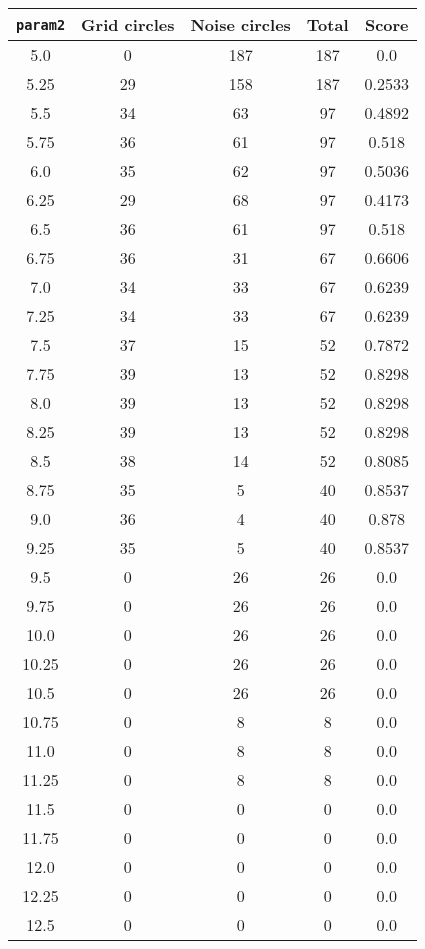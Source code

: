 \documentclass[letterpaper, 12pt]{article}
\begin{document}
\begin{longtable}{|c|c|c|c|c|}
\hline
\textbf{\texttt{param2}} & \textbf{Grid circles} & \textbf{Noise circles} & \textbf{Total} & \textbf{Score} \\
\hline
5.0 & 0 & 187 & 187 & 0.0 \\
\hline
5.25 & 29 & 158 & 187 & 0.2533 \\
\hline
5.5 & 34 & 63 & 97 & 0.4892 \\
\hline
5.75 & 36 & 61 & 97 & 0.518 \\
\hline
6.0 & 35 & 62 & 97 & 0.5036 \\
\hline
6.25 & 29 & 68 & 97 & 0.4173 \\
\hline
6.5 & 36 & 61 & 97 & 0.518 \\
\hline
6.75 & 36 & 31 & 67 & 0.6606 \\
\hline
7.0 & 34 & 33 & 67 & 0.6239 \\
\hline
7.25 & 34 & 33 & 67 & 0.6239 \\
\hline
7.5 & 37 & 15 & 52 & 0.7872 \\
\hline
7.75 & 39 & 13 & 52 & 0.8298 \\
\hline
8.0 & 39 & 13 & 52 & 0.8298 \\
\hline
8.25 & 39 & 13 & 52 & 0.8298 \\
\hline
8.5 & 38 & 14 & 52 & 0.8085 \\
\hline
8.75 & 35 & 5 & 40 & 0.8537 \\
\hline
9.0 & 36 & 4 & 40 & 0.878 \\
\hline
9.25 & 35 & 5 & 40 & 0.8537 \\
\hline
9.5 & 0 & 26 & 26 & 0.0 \\
\hline
9.75 & 0 & 26 & 26 & 0.0 \\
\hline
10.0 & 0 & 26 & 26 & 0.0 \\
\hline
10.25 & 0 & 26 & 26 & 0.0 \\
\hline
10.5 & 0 & 26 & 26 & 0.0 \\
\hline
10.75 & 0 & 8 & 8 & 0.0 \\
\hline
11.0 & 0 & 8 & 8 & 0.0 \\
\hline
11.25 & 0 & 8 & 8 & 0.0 \\
\hline
11.5 & 0 & 0 & 0 & 0.0 \\
\hline
11.75 & 0 & 0 & 0 & 0.0 \\
\hline
12.0 & 0 & 0 & 0 & 0.0 \\
\hline
12.25 & 0 & 0 & 0 & 0.0 \\
\hline
12.5 & 0 & 0 & 0 & 0.0 \\
\hline

\end{longtable}
\end{document}

